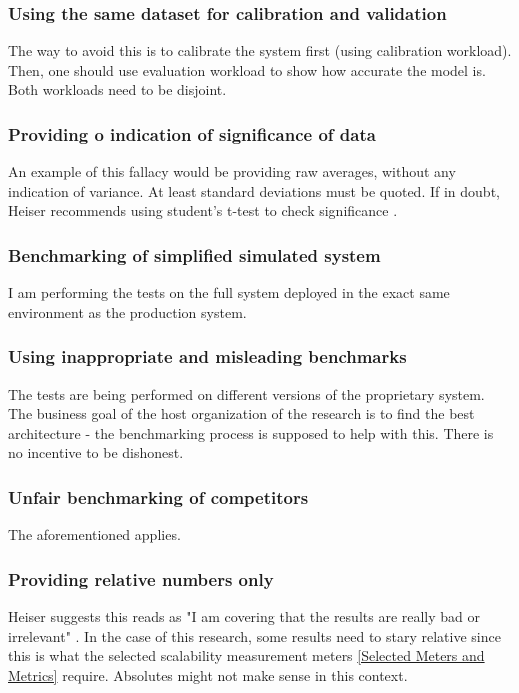 \documentclass{uvamscse}
\begin{document}
\subsubsection{Using the same dataset for calibration and validation}
The way to avoid this is to calibrate the system first (using calibration workload). Then, one should use evaluation workload to show how accurate the model is. Both workloads need to be disjoint.

\subsubsection{Providing o indication of significance of data}
An example of this fallacy would be providing raw averages, without any indication of variance. At least standard deviations must be quoted. If in doubt, Heiser recommends using student's t-test to check significance \cite{GerHeiBench}.

\subsubsection{Benchmarking of simplified simulated system}
I am performing the tests on the full system deployed in the exact same environment as the production system.

\subsubsection{Using inappropriate and misleading benchmarks}
The tests are being performed on different versions of the proprietary system. The business goal of the host organization of the research is to find the best architecture - the benchmarking process is supposed to help with this. There is no incentive to be dishonest.

\subsubsection{Unfair benchmarking of competitors}
The aforementioned applies.

\subsubsection{Providing relative numbers only}
Heiser suggests this reads as "I am covering that the results are really bad or irrelevant" \cite{GerHeiBench}. In the case of this research, some results need to stary relative since this is what the selected scalability measurement meters \ref{Selected Meters and Metrics} require. Absolutes might not make sense in this context.
\end{document}
